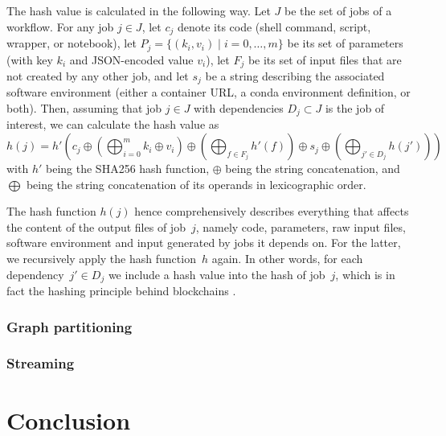 \documentclass[parskip=half]{scrartcl}
\begin{document}
The hash value is calculated in the following way.
Let $J$ be the set of jobs of a workflow.
For any job $j \in J$, let $c_j$ denote its code (shell command, script, wrapper, or notebook), let $P_j = \{(k_i, v_i) \mid i=0,\dots,m\}$ be its set of parameters (with key $k_i$ and JSON-encoded value $v_i$), let $F_j$ be its set of input files that are not created by any other job, and let $s_j$ be a string describing the associated software environment (either a container URL, a conda environment definition, or both).
Then, assuming that job $j \in J$ with dependencies $D_j \subset J$ is the job of interest, we can calculate the hash value as $$ h(j) = h'\left( c_j \oplus \left(\bigoplus_{i=0}^m k_i \oplus v_i \right) \oplus \left( \bigoplus_{f \in F_j} h'(f) \right) \oplus s_j \oplus \left( \bigoplus_{j' \in D_j} h(j') \right) \right) $$ with $h'$ being the SHA256 \parencite{Handschuh} hash function, $\oplus$ being the string concatenation, and $\bigoplus$ being the string concatenation of its operands in lexicographic order.

The hash function $h(j)$ hence comprehensively describes everything that affects the content of the output files of job~\(j\), namely code, parameters, raw input files, software environment and input generated by jobs it depends on.
For the latter, we recursively apply the hash function~\(h\) again.
In other words, for each dependency~\(j' \in D_j\) we include a hash value into the hash of job~\(j\), which is in fact the hashing principle behind blockchains \parencite{narayanan_bitcoin_2016}.

\subsubsection{Graph partitioning}

\subsubsection{Streaming}

\section{Conclusion}
\end{document}
